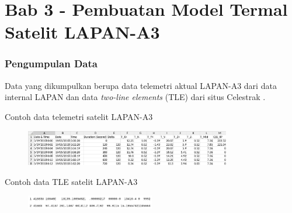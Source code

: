 \documentclass[8pt]{beamer}
\begin{document}
\section{Bab 3 - Pembuatan Model Termal Satelit LAPAN-A3}
\begin{frame}
  \frametitle{Pengumpulan Data}
  Data yang dikumpulkan berupa data telemetri aktual LAPAN-A3 dari data internal LAPAN dan data \textit{two-line elements} (TLE) dari situs Celestrak \cite{kelso}.
  \begin{block}{\center Contoh data telemetri satelit LAPAN-A3}
      \begin{figure}
          \includegraphics[width=0.8\textwidth]{figure/telea3.png}
      \end{figure}
    \end{block}
    \begin{block}{\center Contoh data TLE satelit LAPAN-A3}
      \begin{figure}
          \includegraphics[width=0.5\textwidth]{figure/tlea3.png}
      \end{figure}
    \end{block}
\end{frame}
\end{document}
